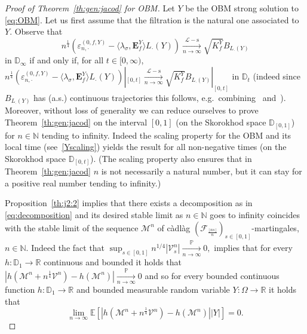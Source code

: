 \documentclass[12pt]{article}
\numberwithin{equation}{section}
\theoremstyle{definition}
\theoremstyle{remark}
\newcommand{\convp}[1][]{\xrightarrow[#1]{\PP}}
\newcommand{\convsl}[1][]{\xrightarrow[#1]{\mathcal{L}-\mathrm{s}}}
\newcommand{\NN}{\mathbb{N}}
\newcommand{\RR}{\mathbb{R}}
\newcommand{\PP}{\mathbb{P}}
\newcommand{\EE}{\mathbb{E}}
\newcommand{\bfH}[1]{\mathbf{E}^Y_{#1}}
\begin{document}
\begin{proof}[Proof of Theorem~\ref{th:gen:jacod} for OBM]
Let $Y$ be the OBM strong solution to \eqref{eq:OBM}. 
Let us first assume that the filtration is the natural one associated to $Y$. 
Observe that
\[ 
	n^\frac14\left( \varepsilon^{(0,f,Y)}_{n,\cdot} - \langle \lambda_\sigma, \bfH{f} \rangle L_\cdot(Y)\right) \convsl[n\to\infty] \sqrt{K_f^Y} B_{L_\cdot(Y)}
\] 
in $\mathbb{D}_\infty$
if and only if, for all $t\in [0,\infty)$, 
$
	n^\frac14 (\varepsilon^{(0,f,Y)}_{n,\cdot} - \langle \lambda_\sigma, \bfH{f} \rangle L_\cdot(Y))|_{[0,t]} \convsl[n\to\infty] \sqrt{K_f^Y} B_{L_\cdot(Y)}|_{[0,t]}
$
in $\mathbb{D}_t$ (indeed since $B_{L_\cdot(Y)}$ has (a.s.) continuous trajectories 
this follows, e.g.~combining~\cite[Theorem~16.2]{billingsley} and~\cite[Proposition~2.2.4]{jp}).
Moreover, without loss of generality we can reduce ourselves to prove Theorem~\ref{th:gen:jacod} on the interval $[0,1]$ (on the Skorokhod space $\mathbb{D}_{[0,1]}$) for $n\in \NN$ tending to infinity. Indeed the scaling property for the OBM and its local time (see~\eqref{Yscaling}) yields the result for all non-negative times (on the Skorokhod space $\mathbb{D}_{[0,t]}$).
(The scaling property also ensures that in Theorem~\ref{th:gen:jacod} $n$ is not necessarily a natural number, but it can stay for a positive real number tending to infinity.)


Proposition~\ref{th:j2:2} 
implies that there exists a decomposition as in \eqref{eq:decomposition} and its desired stable limit as $n\in \NN$ goes to infinity coincides with the stable limit of the sequence 
$\mathcal{M}^n$ of c\`adl\`ag $(\mathcal{F}_{\frac{\lfloor n s\rfloor}n})_{s\in [0,1]}$-martingales, $n\in \NN$. 
Indeed the fact that 
$ 
	\sup_{s\in [0,1]} n^{1/4} |\mathcal{V}^n_s| \convp[n\to\infty] 0,
$ 
implies that
for every $h\colon \mathbb{D}_1 \to \RR$ continuous and bounded it holds that 
$ |h(\mathcal{M}^n + n^\frac14 \mathcal{V}^n)-h(\mathcal{M}^n)| \convp[n\to\infty] 0$
and so
for every bounded continuous function $h\colon \mathbb{D}_1 \to \RR$ and bounded measurable random variable $Y\colon \Omega \to \RR$ it holds that
\[
	\lim_{n\to\infty} \EE\!\left[|h(\mathcal{M}^n + n^\frac14 \mathcal{V}^n)-h(\mathcal{M}^n)|| Y|\right] = 0.
\]


\end{proof}
\end{document}
